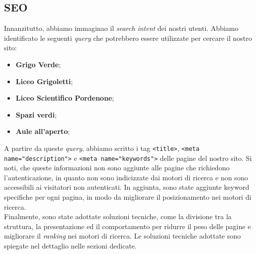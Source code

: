 \subsection{SEO}

Innanzitutto, abbiamo immaginao il \textit{search intent} dei nostri utenti.
Abbiamo identificato le seguenti \textit{query} che potrebbero essere
utilizzate per cercare il nostro sito:
\begin{itemize}
	\item \textbf{Grigo Verde};
	\item \textbf{Liceo Grigoletti};
	\item \textbf{Liceo Scientifico Pordenone};
	\item \textbf{Spazi verdi};
	\item \textbf{Aule all'aperto};
\end{itemize}

A partire da queste \textit{query}, abbiamo scritto i tag \texttt{<title>},
\texttt{<meta name="description">} e \texttt{<meta name="keywords">} delle
pagine del nostro sito. Si noti, che queste informazioni non sono aggiunte alle
pagine che richiedono l'autenticazione, in quanto non sono indicizzate dai
motori di ricerca e non sono accessibili ai visitatori non autenticati. In
aggiunta, sono state aggiunte keyword specifiche per ogni pagina, in modo da
migliorare il posizionamento nei motori di ricerca.\\
Finalmente, sono state adottate soluzioni tecniche, come la
divisione tra la struttura, la presentazione ed il comportamento per ridurre il
peso delle pagine e migliorare il \textit{ranking} nei motori di ricerca. Le
soluzioni tecniche adottate sono spiegate nel dettaglio nelle sezioni dedicate.
